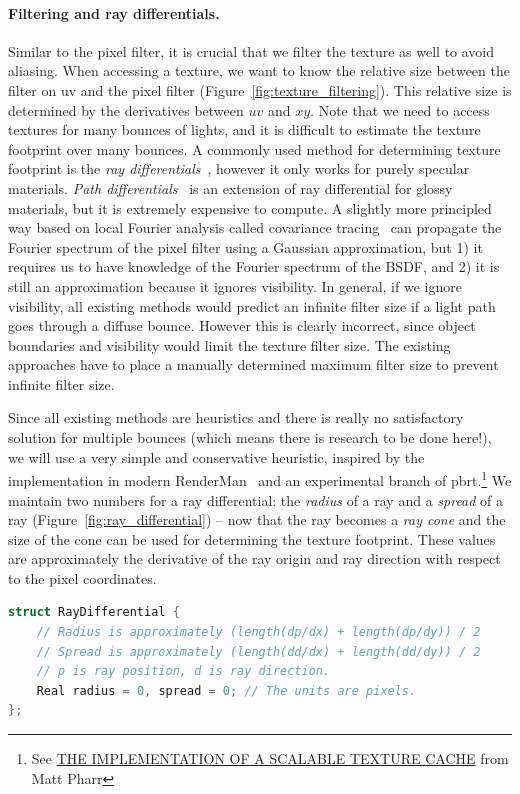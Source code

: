 \paragraph{Filtering and ray differentials.} Similar to the pixel filter, it is crucial that we filter the texture as well to avoid aliasing. When accessing a texture, we want to know the relative size between the filter on uv and the pixel filter (Figure~\ref{fig:texture_filtering}). This relative size is determined by the derivatives between $uv$ and $xy$. Note that we need to access textures for many bounces of lights, and it is difficult to estimate the texture footprint over many bounces. A commonly used method for determining texture footprint is the \emph{ray differentials}~\cite{Igehy:1999:TRD}, however it only works for purely specular materials. \emph{Path differentials}~\cite{Suykens:2001:PDA} is an extension of ray differential for glossy materials, but it is extremely expensive to compute. A slightly more principled way based on local Fourier analysis called covariance tracing~\cite{Belcour:2017:ACG} can propagate the Fourier spectrum of the pixel filter using a Gaussian approximation, but 1) it requires us to have knowledge of the Fourier spectrum of the BSDF, and 2) it is still an approximation because it ignores visibility. In general, if we ignore visibility, all existing methods would predict an infinite filter size if a light path goes through a diffuse bounce. However this is clearly incorrect, since object boundaries and visibility would limit the texture filter size. The existing approaches have to place a manually determined maximum filter size to prevent infinite filter size.

Since all existing methods are heuristics and there is really no satisfactory solution for multiple bounces (which means there is research to be done here!), we will use a very simple and conservative heuristic, inspired by the implementation in modern RenderMan~\cite{Christensen:2018:RAP} and an experimental branch of pbrt.\footnote{See \href{https://www.pbrt.org/texcache.pdf}{THE IMPLEMENTATION OF A SCALABLE TEXTURE CACHE} from Matt Pharr} We maintain two numbers for a ray differential: the \emph{radius} of a ray and a \emph{spread} of a ray (Figure~\ref{fig:ray_differential}) -- now that the ray becomes a \emph{ray cone} and the size of the cone can be used for determining the texture footprint. These values are approximately the derivative of the ray origin and ray direction with respect to the pixel coordinates.
\begin{lstlisting}[language=c++]
struct RayDifferential {
    // Radius is approximately (length(dp/dx) + length(dp/dy)) / 2
    // Spread is approximately (length(dd/dx) + length(dd/dy)) / 2
    // p is ray position, d is ray direction.
    Real radius = 0, spread = 0; // The units are pixels.
};
\end{lstlisting}

